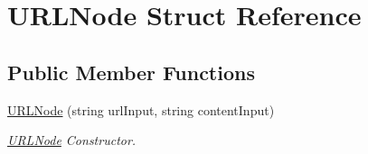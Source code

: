 \hypertarget{classURLNode}{\section{\-U\-R\-L\-Node \-Struct \-Reference}
\label{classURLNode}
}
\subsection*{\-Public \-Member \-Functions}
\begin{DoxyCompactItemize}
\item 
\hyperlink{classURLNode_a884b929b580ed24de145730114e45f01}{\-U\-R\-L\-Node} (string url\-Input, string content\-Input)
\begin{DoxyCompactList}\small\item\em \hyperlink{classURLNode}{\-U\-R\-L\-Node} \-Constructor. \end{DoxyCompactList}\end{DoxyCompactItemize}
